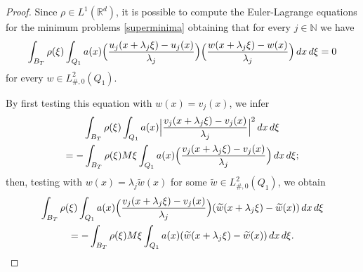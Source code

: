 \documentclass{article}
\theoremstyle{definition}
\newcommand{\N}{\mathbb{N}}
\newcommand{\R}{\mathbb{R}}
\begin{document}
\begin{proof}
Since $\rho\in L^1(\R^d)$, it is possible to compute the Euler-Lagrange equations for the minimum problems \eqref{superminima} obtaining that for every $j\in\N$ we have
\begin{equation*}
    \int_{B_T} \rho(\xi)\int_{Q_1} a(x)\Bigl(\frac{u_j(x+\lambda_j\xi)-u_j(x)}{\lambda_j}\Bigr)\Bigl(\frac{w(x+\lambda_j\xi)-w(x)}{\lambda_j}\Bigr)\, dx\,d\xi=0 
\end{equation*}
for every $w\in L^2_{\#,0}(Q_1)$.

By first testing this equation with $w(x)=v_j(x)$, we infer
\begin{multline}
    \int_{B_T} \rho(\xi)\int_{Q_1} a(x)\Bigl|\frac{v_j(x+\lambda_j\xi)-v_j(x)}{\lambda_j}\Bigr|^2\, dx\,d\xi \\ \label{ele1}
    = - \int_{B_T} \rho(\xi)M\xi\int_{Q_1} a(x)\Bigl(\frac{v_j(x+\lambda_j\xi)-v_j(x)}{\lambda_j}\Bigr)\, dx\,d\xi;
\end{multline}
then, testing with $w(x)=\lambda_j\widetilde{w}(x)$ for some $\widetilde{w}\in L^2_{\#,0}(Q_1)$, we obtain
\begin{multline}\label{ele2}
     \int_{B_T} \rho(\xi)\int_{Q_1} a(x)\Bigl(\frac{v_j(x+\lambda_j\xi)-v_j(x)}{\lambda_j}\Bigr)(\widetilde{w}(x+\lambda_j\xi)-\widetilde{w}(x))\, dx\,d\xi \\
     = - \int_{B_T} \rho(\xi)M\xi\int_{Q_1} a(x)(\widetilde{w}(x+\lambda_j\xi)-\widetilde{w}(x))\, dx\,d\xi.
\end{multline}


\end{proof}
\end{document}
